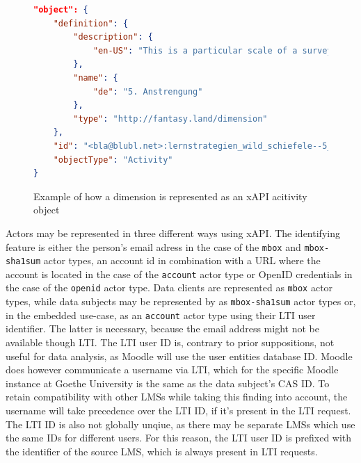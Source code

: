 \documentclass[a4paper,11pt]{article}
\def\inline{\lstinline[basicstyle=\ttfamily,keywordstyle={}]}
\begin{document}
                \begin{figure}
                    \begin{lstlisting}[language=JSON]
"object": {
    "definition": {
        "description": {
            "en-US": "This is a particular scale of a survey, it usually contains multiple questions."
        },
        "name": {
            "de": "5. Anstrengung"
        },
        "type": "http://fantasy.land/dimension"
    },
    "id": "<bla@blubl.net>:lernstrategien_wild_schiefele--5_anstrengung",
    "objectType": "Activity"
}
                    \end{lstlisting}
                    \caption{Example of how a dimension is represented as an xAPI acitivity object}
                    \label{fig:example-xapi-activity-dimension}
                \end{figure}

                Actors may be represented in three different ways using xAPI. 
                The identifying feature is either the person's email adress in the case
                of the \inline{mbox} and \inline{mbox-sha1sum} actor types, an account id 
                in combination with a URL where the account is located in the case of the 
                \inline{account} actor type
                or OpenID credentials in the case of the \inline{openid} actor type.
                Data clients are represented as \inline{mbox} actor types, while data subjects may 
                be represented by as \inline{mbox-sha1sum} actor types
                or, in the embedded use-case, as an \inline{account} actor type using their
                LTI user identifier. The latter is necessary, because the email address might not be available
                though LTI. The LTI user ID is, contrary to prior suppositions, not
                useful for data analysis, as Moodle will use the user entities database ID.
                Moodle does however communicate a username via LTI, which for the specific Moodle instance
                at Goethe University is the same as the data subject's CAS ID.
                To retain compatibility with other LMSs while taking this finding into account,
                the username will take precedence over the LTI ID, if it's present in the LTI request.
                The LTI ID is also not globally unqiue, as there may be separate LMSs which
                use the same IDs for different users. For this reason, the LTI user ID is
                prefixed with the identifier of the source LMS, which is always present in LTI requests.
\end{document}
